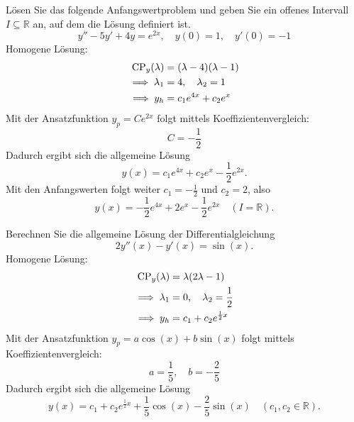 Lösen Sie das folgende Anfangswertproblem und geben Sie ein offenes Intervall $I \subseteq \mathbb{R}$ an, auf dem die Lösung definiert ist.
\begin{displaymath}
  y'' - 5y' + 4y = e^{2x}, \quad y(0) = 1, \quad y'(0) = -1
\end{displaymath}
Homogene Lösung:
\begin{align*}
  \operatorname{CP}_y(\lambda) &= (\lambda - 4)(\lambda - 1)\\
  \implies \lambda_1 &= 4, \quad \lambda_2 = 1\\
  \implies y_h &= c_1 e^{4x} + c_2 e^{x}
\end{align*}
Mit der Ansatzfunktion $y_p = Ce^{2x}$ folgt mittels Koeffizientenvergleich:
\begin{displaymath}
  C = -\frac{1}{2}
\end{displaymath}
Dadurch ergibt sich die allgemeine Lösung
\begin{displaymath}
  y(x) = c_1 e^{4x} + c_2 e^{x} - \frac{1}{2}e^{2x}.
\end{displaymath}
Mit den Anfangswerten folgt weiter $c_1 = -\frac{1}{2}$ und $c_2 = 2$, also
\begin{displaymath}
  y(x) = -\frac{1}{2} e^{4x} + 2 e^{x} - \frac{1}{2}e^{2x} \quad (I = \mathbb{R}).
\end{displaymath}

Berechnen Sie die allgemeine Lösung der Differentialgleichung
\begin{displaymath}
  2y''(x) - y'(x) = \sin(x).
\end{displaymath}
Homogene Lösung:
\begin{align*}
  \operatorname{CP}_y(\lambda) &= \lambda(2\lambda - 1)\\
  \implies \lambda_1 &= 0, \quad \lambda_2 = \frac{1}{2}\\
  \implies y_h &= c_1 + c_2 e^{\frac{1}{2} x}
\end{align*}
Mit der Ansatzfunktion $y_p = a \cos(x) + b\sin(x)$ folgt mittels Koeffizientenvergleich:
\begin{displaymath}
  a = \frac{1}{5}, \quad b = -\frac{2}{5}
\end{displaymath}
Dadurch ergibt sich die allgemeine Lösung
\begin{displaymath}
  y(x) = c_1 + c_2 e^{\frac{1}{2} x} + \frac{1}{5}\cos(x) - \frac{2}{5}\sin(x) \quad (c_1, c_2 \in \mathbb{R}).
\end{displaymath}

